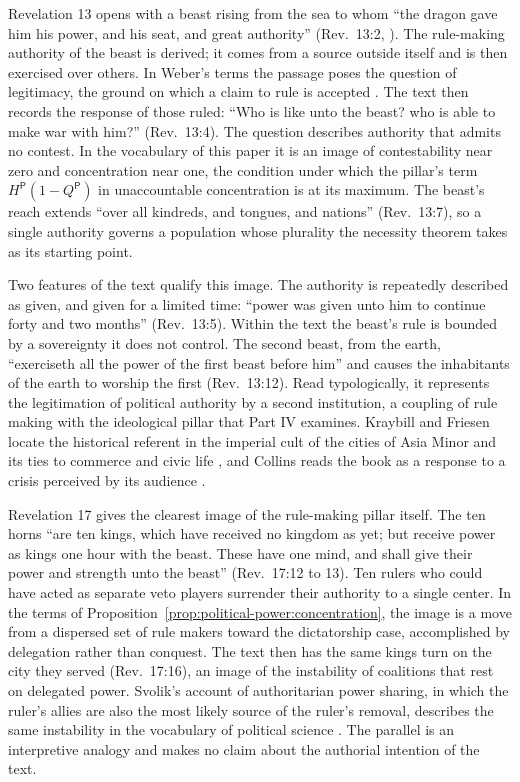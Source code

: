 \documentclass[11pt,letterpaper]{article}
\theoremstyle{definition}
\theoremstyle{remark}
\newcommand{\pP}{\mathsf{P}}
\begin{document}
Revelation 13 opens with a beast rising from the sea to whom ``the dragon gave him his power, and his seat, and great authority'' (Rev.\ 13:2, \citealp{kjv}). The rule-making authority of the beast is derived; it comes from a source outside itself and is then exercised over others. In Weber's terms the passage poses the question of legitimacy, the ground on which a claim to rule is accepted \citep{weber1978}. The text then records the response of those ruled: ``Who is like unto the beast? who is able to make war with him?'' (Rev.\ 13:4). The question describes authority that admits no contest. In the vocabulary of this paper it is an image of contestability near zero and concentration near one, the condition under which the pillar's term $H^{\pP}(1-Q^{\pP})$ in unaccountable concentration is at its maximum. The beast's reach extends ``over all kindreds, and tongues, and nations'' (Rev.\ 13:7), so a single authority governs a population whose plurality the necessity theorem takes as its starting point.

Two features of the text qualify this image. The authority is repeatedly described as given, and given for a limited time: ``power was given unto him to continue forty and two months'' (Rev.\ 13:5). Within the text the beast's rule is bounded by a sovereignty it does not control. The second beast, from the earth, ``exerciseth all the power of the first beast before him'' and causes the inhabitants of the earth to worship the first (Rev.\ 13:12). Read typologically, it represents the legitimation of political authority by a second institution, a coupling of rule making with the ideological pillar that Part IV examines. Kraybill and Friesen locate the historical referent in the imperial cult of the cities of Asia Minor and its ties to commerce and civic life \citep{kraybill1996,friesen2001}, and Collins reads the book as a response to a crisis perceived by its audience \citep{collins1984}.

Revelation 17 gives the clearest image of the rule-making pillar itself. The ten horns ``are ten kings, which have received no kingdom as yet; but receive power as kings one hour with the beast. These have one mind, and shall give their power and strength unto the beast'' (Rev.\ 17:12 to 13). Ten rulers who could have acted as separate veto players surrender their authority to a single center. In the terms of Proposition~\ref{prop:political-power:concentration}, the image is a move from a dispersed set of rule makers toward the dictatorship case, accomplished by delegation rather than conquest. The text then has the same kings turn on the city they served (Rev.\ 17:16), an image of the instability of coalitions that rest on delegated power. Svolik's account of authoritarian power sharing, in which the ruler's allies are also the most likely source of the ruler's removal, describes the same instability in the vocabulary of political science \citep{svolik2012}. The parallel is an interpretive analogy and makes no claim about the authorial intention of the text.
\end{document}
